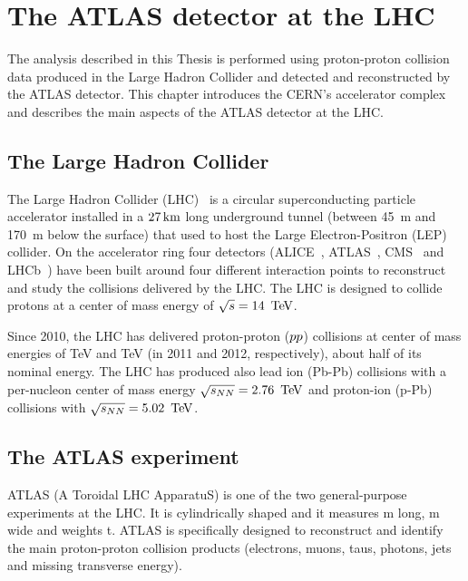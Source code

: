 \chapter{The ATLAS detector at the LHC}
    \label{chapter:ATLASDetector}

The analysis described in this Thesis is performed using proton-proton collision data produced in the Large Hadron Collider and detected and reconstructed by the ATLAS detector.
This chapter introduces the CERN's accelerator complex and describes the main aspects of the ATLAS detector at the LHC. 

\section{The Large Hadron Collider}
    \label{sec:LHC}

The Large Hadron Collider (LHC)~\cite{Evans:2008zzb} is a circular superconducting particle accelerator installed in a $\unit[27]{km}$ long underground tunnel (between 45~m and 170~m below the surface) that used to host the Large Electron-Positron (LEP) collider.
On the accelerator ring four detectors (ALICE~\cite{Aamodt:2008zz}, ATLAS~\cite{Aad:2008zzm}, CMS~\cite{Chatrchyan:2008aa} and LHCb~\cite{Alves:2008zz}) have been built around four different interaction points to reconstruct and study the collisions delivered by the LHC. 
The LHC is designed to collide protons at a center of mass energy of $\sqrt{s} = \unit[14]{\TeV}$. 

Since 2010, the LHC has delivered proton-proton ($pp$) collisions at center of mass energies of \unit[7]{\TeV} and \unit[8]{\TeV} (in 2011 and 2012, respectively), about half of its nominal energy. The LHC has produced also lead ion (Pb-Pb) collisions with a per-nucleon center of mass energy $\sqrt{s_{NN}} = \unit[2.76]{\TeV}$ and proton-ion (p-Pb) collisions with $\sqrt{s_{NN}} = \unit[5.02]{\TeV}$.

\section{The ATLAS experiment}
    \label{sec:ATLASexperiment}

ATLAS (A Toroidal LHC ApparatuS) is one of the two general-purpose experiments at the LHC. 
It is cylindrically shaped and it measures \unit[46]{m} long, \unit[25]{m} wide and weights \unit[7000]{t}.
ATLAS is specifically designed to reconstruct and identify the main proton-proton collision products (electrons, muons, taus, photons, jets and missing transverse energy). 

